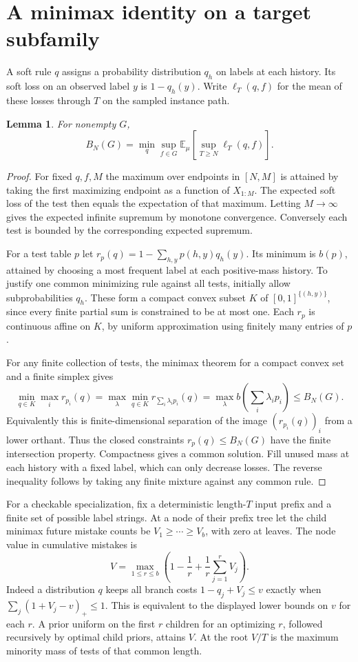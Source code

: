 \documentclass[11pt]{article}
\newtheorem{lemma}[theorem]{Lemma}
\newcommand{\E}{\mathbb E}
\begin{document}
\section{A minimax identity on a target subfamily}
A soft rule $q$ assigns a probability distribution $q_h$ on labels at each history. Its soft loss on an observed label $y$ is $1-q_h(y)$. Write $\ell_T(q,f)$ for the mean of these losses through $T$ on the sampled instance path.
\begin{lemma}\label{game}
For nonempty $G$,
\[
 B_N(G)=\min_q\sup_{f\in G}\E_\mu\!\left[\sup_{T\ge N}\ell_T(q,f)\right].
\]
\end{lemma}
\begin{proof}
For fixed $q,f,M$ the maximum over endpoints in $[N,M]$ is attained by taking the first maximizing endpoint as a function of $X_{1:M}$. The expected soft loss of the test then equals the expectation of that maximum. Letting $M\to\infty$ gives the expected infinite supremum by monotone convergence. Conversely each test is bounded by the corresponding expected supremum.

For a test table $p$ let $r_p(q)=1-\sum_{h,y}p(h,y)q_h(y)$. Its minimum is $b(p)$, attained by choosing a most frequent label at each positive-mass history. To justify one common minimizing rule against all tests, initially allow subprobabilities $q_h$. These form a compact convex subset $K$ of $[0,1]^{\{(h,y)\}}$, since every finite partial sum is constrained to be at most one. Each $r_p$ is continuous affine on $K$, by uniform approximation using finitely many entries of $p$.

For any finite collection of tests, the minimax theorem for a compact convex set and a finite simplex gives
\[
 \min_{q\in K}\max_i r_{p_i}(q)
 =\max_{\lambda}\min_{q\in K}r_{\sum_i\lambda_i p_i}(q)
 =\max_{\lambda} b\!\left(\sum_i\lambda_i p_i\right)\le B_N(G).
\]
Equivalently this is finite-dimensional separation of the image $(r_{p_i}(q))_i$ from a lower orthant. Thus the closed constraints $r_p(q)\le B_N(G)$ have the finite intersection property. Compactness gives a common solution. Fill unused mass at each history with a fixed label, which can only decrease losses. The reverse inequality follows by taking any finite mixture against any common rule.
\end{proof}

For a checkable specialization, fix a deterministic length-$T$ input prefix and a finite set of possible label strings. At a node of their prefix tree let the child minimax future mistake counts be $V_1\ge\cdots\ge V_b$, with zero at leaves. The node value in cumulative mistakes is
\[
 V=\max_{1\le r\le b}\left(1-\frac1r+\frac1r\sum_{j=1}^rV_j\right).
\]
Indeed a distribution $q$ keeps all branch costs $1-q_j+V_j\le v$ exactly when $\sum_j(1+V_j-v)_+\le1$. This is equivalent to the displayed lower bounds on $v$ for each $r$. A prior uniform on the first $r$ children for an optimizing $r$, followed recursively by optimal child priors, attains $V$. At the root $V/T$ is the maximum minority mass of tests of that common length.
\end{document}
